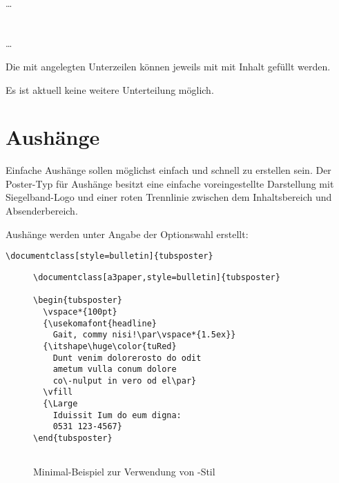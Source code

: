 \begin{Declaration}
  \\%
  \quad\dots\\
  \\
  \\%
  \quad\dots\\
\end{Declaration}

Die mit  angelegten Unterzeilen können jeweils mit 
 mit Inhalt gefüllt werden.

Es ist aktuell keine weitere Unterteilung möglich.


\clearpage
\section{Aushänge}

Einfache Aushänge sollen möglichst einfach und schnell zu erstellen sein.
Der Poster-Typ für Aushänge besitzt eine einfache voreingestellte Darstellung
mit Siegelband-Logo und einer roten Trennlinie zwischen dem Inhaltsbereich
und Absenderbereich.

Aushänge werden unter Angabe der Optionswahl
 erstellt:
\begin{lstlisting}
\documentclass[style=bulletin]{tubsposter}
\end{lstlisting}

\begin{figure}[!ht]
\begin{minipage}{0.65\textwidth}
\begin{lstlisting}
\documentclass[a3paper,style=bulletin]{tubsposter}

\begin{tubsposter}
  \vspace*{100pt}
  {\usekomafont{headline}
    Gait, commy nisi!\par\vspace*{1.5ex}}
  {\itshape\huge\color{tuRed}
    Dunt venim dolorerosto do odit
    ametum vulla conum dolore
    co\-nulput in vero od el\par}
  \vfill
  {\Large
    Iduissit Ium do eum digna:
    0531 123-4567}
\end{tubsposter}


\end{lstlisting}
\end{minipage}
\begin{minipage}{0.35\textwidth}
\end{minipage}
\caption{Minimal-Beispiel zur Verwendung von -Stil 
  }
\end{figure}

